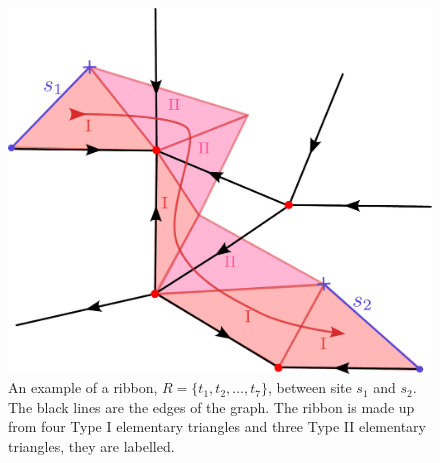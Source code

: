 \documentclass[two column]{article}
\begin{document}
\begin{figure}
    \centering
    \includegraphics[width= \linewidth]{Figures/ribbon_exampl.pdf}
    \caption{An example of a ribbon, $R = \{t_1, t_2, \ldots, t_7\}$, between site $s_1$ and $s_2$. The black lines are the edges of the graph. The ribbon is made up from four Type I elementary triangles and three Type II elementary triangles, they are labelled.}
    \label{fig:rib_exampl}
\end{figure}
\end{document}
